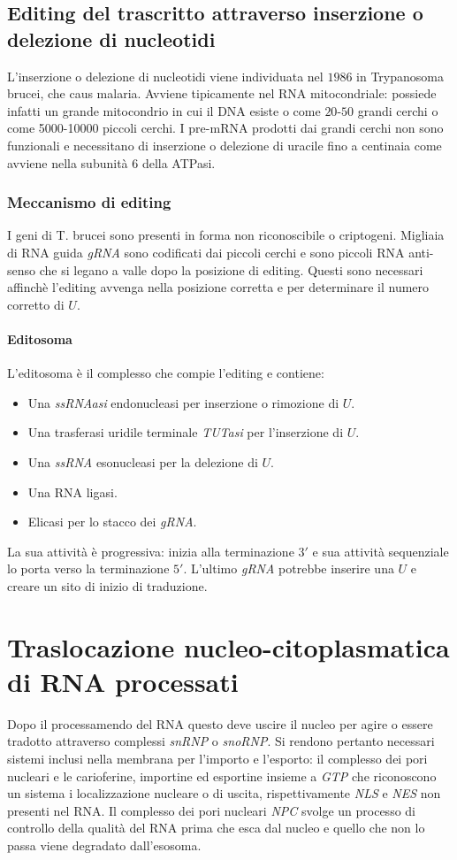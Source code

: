 \subsection{Editing del trascritto attraverso inserzione o delezione di nucleotidi}
L'inserzione o delezione di nucleotidi viene individuata nel $1986$ in Trypanosoma brucei, che caus malaria. Avviene tipicamente nel RNA mitocondriale: possiede infatti un grande 
mitocondrio in cui il DNA esiste o come $20$-$50$ grandi cerchi o come \num{5000}-\num{10000} piccoli cerchi. I pre-mRNA prodotti dai grandi cerchi non sono funzionali e necessitano di 
inserzione o delezione di uracile fino a centinaia come avviene nella subunit\`a $6$ della ATPasi. 
\subsubsection{Meccanismo di editing}
I geni di T. brucei sono presenti in forma non riconoscibile o criptogeni. Migliaia di RNA guida \emph{gRNA} sono codificati dai piccoli cerchi e sono piccoli RNA anti-senso che si 
legano a valle dopo la posizione di editing. Questi sono necessari affinch\`e l'editing avvenga nella posizione corretta e per determinare il numero corretto di $U$. 
\paragraph{Editosoma}
L'editosoma \`e il complesso che compie l'editing e contiene: 
\begin{itemize}
	\item Una \emph{ssRNAasi} endonucleasi per inserzione o rimozione di $U$.
	\item Una trasferasi uridile terminale \emph{TUTasi} per l'inserzione di $U$.
	\item Una \emph{ssRNA} esonucleasi per la delezione di $U$.
	\item Una RNA ligasi.
	\item Elicasi per lo stacco dei \emph{gRNA}.
\end{itemize}
La sua attivit\`a \`e progressiva: inizia alla terminazione  $3'$ e sua attivit\`a sequenziale lo porta verso la terminazione $5'$. L'ultimo \emph{gRNA} potrebbe inserire una $U$ e 
creare un sito di inizio di traduzione. 
\section{Traslocazione nucleo-citoplasmatica di RNA processati}
Dopo il processamendo del RNA questo deve uscire il nucleo per agire o essere tradotto attraverso complessi \emph{snRNP} o \emph{snoRNP}. Si rendono pertanto necessari sistemi inclusi
nella membrana per l'importo e l'esporto: il complesso dei pori nucleari e le carioferine, importine ed esportine insieme a \emph{GTP} che riconoscono un sistema i localizzazione
nucleare o di uscita, rispettivamente \emph{NLS} e \emph{NES} non presenti nel RNA. Il complesso dei pori nucleari \emph{NPC} svolge un processo di controllo della qualit\`a del RNA
prima che esca dal nucleo e quello che non lo passa viene degradato dall'esosoma. 
